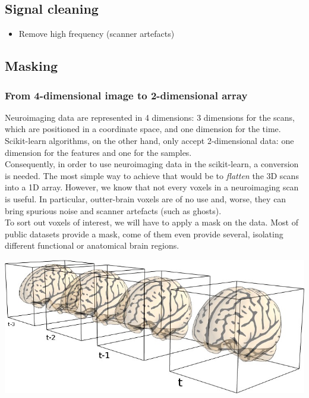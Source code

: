 \documentclass{frontiersSCNS} %
\newcommand{\alex}[1]{\todo[inline, color=green!40]{#1}}
\begin{document}
\subsection{Signal cleaning}

\begin{itemize}
    \item Remove high frequency (scanner artefacts)
\end{itemize}


\subsection{Masking}


\subsubsection{From 4-dimensional image to 2-dimensional array}

Neuroimaging data are represented in 4 dimensions: 3 dimensions for the scans,
which are positioned in a coordinate space, and one dimension for the time.
Scikit-learn algorithms, on the other hand, only accept 2-dimensional data: one
dimension for the features and one for the samples.\\

Consequently, in order to use neuroimaging data in the scikit-learn, a
conversion is needed. The most simple way to achieve that would be to
\emph{flatten} the 3D scans into a 1D array. However, we know that not every
voxels in a neuroimaging scan is useful. In particular, outter-brain voxels are
of no use and, worse, they can bring spurious noise and scanner artefacts (such
as ghosts).\\

To sort out voxels of interest, we will have to apply a mask on the data. Most
of public datasets provide a mask, come of them even provide several, isolating
different functional or anatomical brain regions. \alex{ref to Haxby}

\includegraphics[width=.5\linewidth]{img/niimgs.jpg}
\end{document}
